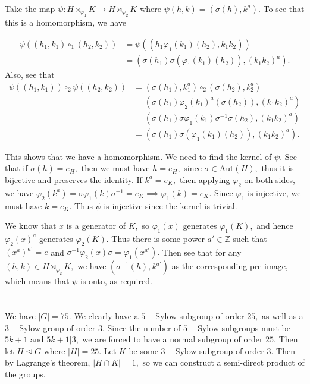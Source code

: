 \documentclass{article}
\begin{document}
Take the map $\psi: H \rtimes_{\varphi_1} K \to H \rtimes_{\varphi_2} K$ where $\psi(h,k)=(\sigma(h),k^a).$ To see that this is a homomorphism, we have 

\begin{align*}
	\psi((h_1,k_1)\circ_{1}(h_2,k_2)) &= \psi((h_1 \varphi_1(k_1)(h_2),k_1k_2))\\
	&= (\sigma(h_1)\sigma(\varphi_1(k_1)(h_2)), (k_1k_2)^a).
\end{align*}
Also, see that \begin{align*}
	\psi((h_1,k_1))\circ_{2}\psi((h_2,k_2)) &= (\sigma(h_1),k_1^a) \circ_{2} (\sigma(h_2),k_2^a)\\
	&=(\sigma(h_1) \varphi_2(k_1)^a(\sigma(h_2)), (k_1k_2)^a)\\
	&=(\sigma(h_1)\sigma\varphi_1(k_1)\sigma^{-1}\sigma(h_2), (k_1k_2)^a)\\
	&= (\sigma(h_1)\sigma(\varphi_1(k_1)(h_2)), (k_1k_2)^a). 
\end{align*}

This shows that we have a homomorphism. We need to find the kernel of $\psi.$ See that if $\sigma(h)=e_H,$ then we must have $h=e_H,$ since $\sigma \in 
\text{Aut}(H),$ thus it is bijective and preserves the identity. If $k^a=e_K,$ then applying $\varphi_2$ on both sides, we have $\varphi_2(k^a)= \sigma 
\varphi_1(k)\sigma^{-1}=e_K \implies \varphi_1(k)=e_K.$ Since $\varphi_1$ is injective, we must have $k=e_K.$ Thus $\psi$ is injective since the kernel is 
trivial.

We know that $x$ is a generator of $K,$ so $\varphi_1(x)$ generates $\varphi_1(K),$ and hence $\varphi_2(x)^a$ generates $\varphi_2(K).$ Thus there is some 
power $a'\in \mathbb{Z}$ such that $ (x^a)^{a'}=e$ and $\sigma^{-1} \varphi_2(x) \sigma=\varphi_1(x^{a'}).$ Then see that for any $(h,k) \in H 
\rtimes_{\varphi_2} K,$ we have $(\sigma^{-1}(h),k^{a'})$ as the corresponding pre-image, which means that $\psi$ is onto, as required. 

\section{} %
We have $|G| =75.$ We clearly have a $5-$Sylow subgroup of order $25,$ as well as a $3-$Sylow group of order $3.$ Since the number of $5-$Sylow subgroups 
must be $5k+1$ and $5k+1|3,$ we are forced to have a normal subgroup of order $25.$ Then let $H \trianglelefteq G$ where $|H|=25.$ Let $K$ be some $3-$Sylow 
subgroup of order $3.$ Then by Lagrange's theorem, $|H \cap K|=1,$ so we can construct a semi-direct product of the groups.  
\end{document}
